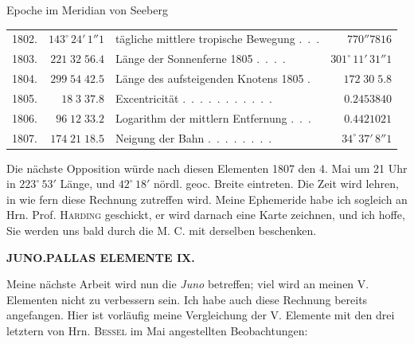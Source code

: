 \par\indent Epoche im Meridian von Seeberg\par\nobreak
\begin{center}\begingroup
\fontsize{8.6}{10.6}\selectfont
\setlength{\tabcolsep}{2.5pt}\renewcommand{\arraystretch}{1.12}
\begin{tabular}{@{}rr|lr@{}}
1802. & $143^\circ\,24'\,1''1$ & tägliche mittlere tropische Bewegung .\ .\ . & $770''7816$ \\
1803. & $221\;32\;56.4$ & Länge der Sonnenferne 1805 .\ .\ .\ . & $301^\circ\,11'\,31''1$ \\
1804. & $299\;54\;42.5$ & Länge des aufsteigenden Knotens 1805 . & $172\;30\;5.8$ \\
1805. & $18\;3\;37.8$ & Excentricität .\ .\ .\ .\ .\ .\ .\ .\ .\ .\ . & $0.2453840$ \\
1806. & $96\;12\;33.2$ & Logarithm der mittlern Entfernung .\ .\ . & $0.4421021$ \\
1807. & $174\;21\;18.5$ & Neigung der Bahn .\ .\ .\ .\ .\ .\ .\ . & $34^\circ\,37'\,8''1$ \\
\end{tabular}\endgroup\end{center}

\par\indent Die nächste Opposition würde nach diesen Elementen 1807 den 4. Mai um 21 Uhr in $223^\circ\,53'$ Länge,
und $42^\circ\,18'$ nördl. geoc. Breite eintreten. Die Zeit wird lehren, in wie fern diese Rechnung zutreffen
wird. Meine Ephemeride habe ich sogleich an Hrn. Prof. \textsc{Harding} geschickt, er wird darnach eine
Karte zeichnen, und ich hoffe, Sie werden uns bald durch die M. C. mit derselben beschenken.
\par
{}
\clearpage
\thispagestyle{empty}
\noindent{}%
%
\parbox[t]{\dimexpr\linewidth-24mm\relax}{\centering\footnotesize\bfseries JUNO.\enspace PALLAS ELEMENTE IX.\par}%
\makebox[12mm][r]{}\par\nobreak\medskip
\par\indent Meine nächste Arbeit wird nun die \emph{Juno} betreffen; viel wird an meinen V. Elementen nicht zu
verbessern sein. Ich habe auch diese Rechnung bereits angefangen. Hier ist vorläufig meine Vergleichung der V. Elemente mit den drei letztern von Hrn. \textsc{Bessel} im Mai angestellten Beobachtungen:

